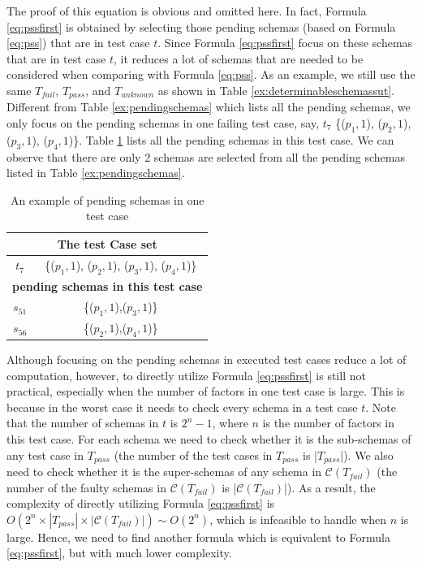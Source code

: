 The proof of this equation is obvious and omitted here. In fact, Formula \ref{eq:pssfirst} is obtained by selecting those pending schemas (based on Formula \ref{eq:pss}) that are in test case $t$.  Since Formula \ref{eq:pssfirst} focus on these schemas that are in test case $t$, it reduces a lot of schemas that are needed to be considered when comparing with Formula \ref{eq:pss}. As an example, we still use the same  $T_{fail}$, $T_{pass}$, and $T_{unknown}$ as shown in Table \ref{ex:determinableschemassut}. Different from Table \ref{ex:pendingschemas} which lists all the pending schemas, we only focus on the pending schemas in one failing test case, say, $t_{7}$ \{($p_{1}, 1$), ($p_{2}, 1$), ($p_{3}, 1$), ($p_{4}, 1$)\}. Table \ref{ex:pendingschemasinonetestcase} lists all the pending schemas in this test case. We can observe that there are only 2 schemas are selected from all the pending schemas listed in Table \ref{ex:pendingschemas}.

\begin{table}[htbp]
  \centering
  \caption{An example of pending schemas in one test case}
  \label{ex:pendingschemasinonetestcase}
    \begin{tabular}{|c|c|} \hline
     \multicolumn{2}{|c|}{\textbf{The test Case set}} \\ \hline
   $t_{7}$ & \{($p_{1}, 1$), ($p_{2}, 1$), ($p_{3}, 1$), ($p_{4}, 1$)\}\\ \hline
        \multicolumn{2}{|c|}{\textbf{pending schemas in this test case}} \\ \hline
   $s_{51}$ & \{($p_{1}, 1$),($p_{3}, 1$)\} \\
   $s_{56}$ & \{($p_{2}, 1$),($p_{4}, 1$)\} \\ \hline
    \end{tabular}%
\end{table}


Although focusing on the pending schemas in executed test cases reduce a lot of computation, however, to directly utilize Formula \ref{eq:pssfirst} is still not practical, especially when the number of factors in one test case is large. This is because in the worst case it needs to check every schema in a test case $t$. Note that the number of schemas in $t$ is $2^{n} - 1$, where $n$ is the number of factors in this test case. For each schema we need to check whether it is the sub-schemas of any test case in $T_{pass}$ (the number of the test cases in $T_{pass}$ is |$T_{pass}$|). We also need to check whether it is the super-schemas of any schema in $\mathcal{C}(T_{fail})$ (the number of the faulty schemas in $\mathcal{C}(T_{fail})$ is |$\mathcal{C}(T_{fail})$|). As a result, the complexity of directly utilizing Formula \ref{eq:pssfirst} is $O(2^{n} \times |T_{pass}| \times |\mathcal{C}(T_{fail})|) \sim O(2^{n})$, which is infeasible to handle when $n$ is large. Hence, we need to find another formula which is equivalent to Formula \ref{eq:pssfirst}, but with much lower complexity.


